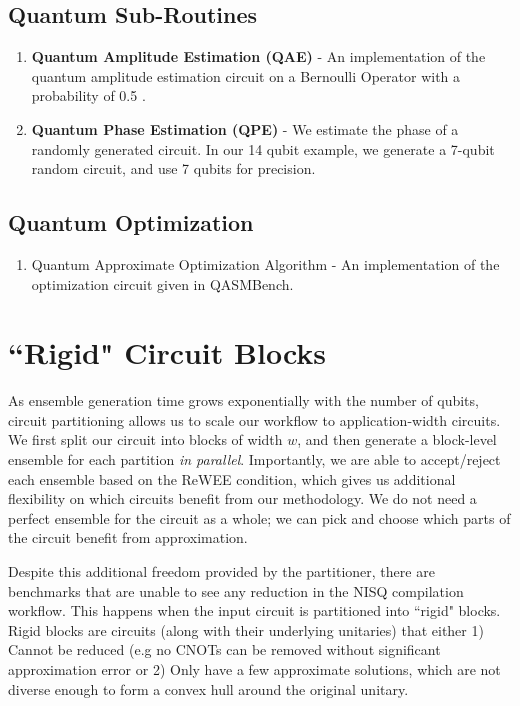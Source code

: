 \documentclass[fleqn,10pt]{wlscirep}
\begin{document}
\subsection*{Quantum Sub-Routines}

\begin{enumerate}
    \item \textbf{Quantum Amplitude Estimation (QAE)} - An implementation of the quantum amplitude estimation circuit on a Bernoulli Operator with a probability of 0.5 \cite{qiskit, brassard}.
    \item \textbf{Quantum Phase Estimation (QPE)} - We estimate the phase of a randomly generated circuit. In our 14 qubit example, we generate a 7-qubit random circuit, and use 7 qubits for precision.
\end{enumerate}

\subsection*{Quantum Optimization}

\begin{enumerate}
    \item Quantum Approximate Optimization Algorithm - An implementation of the optimization circuit given in QASMBench\cite{qasm_bench}.
\end{enumerate}

\section{``Rigid" Circuit Blocks}
\label{sec:rigid_blocks}
As ensemble generation time grows exponentially with the number of qubits, circuit partitioning allows us to scale our workflow to application-width circuits. We first split our circuit into blocks of width $w$, and then generate a block-level ensemble for each partition \emph{in parallel}. Importantly, we are able to accept/reject each ensemble based on the ReWEE condition, which gives us additional flexibility on which circuits benefit from our methodology. We do not need a perfect ensemble for the circuit as a whole; we can pick and choose which parts of the circuit benefit from approximation.

Despite this additional freedom provided by the partitioner, there are benchmarks that are unable to see any reduction in the NISQ compilation workflow. This happens when the input circuit is partitioned into ``rigid" blocks. Rigid blocks are circuits (along with their underlying unitaries) that either 1) Cannot be reduced (e.g no CNOTs can be removed without significant approximation error or 2) Only have a few approximate solutions, which are not diverse enough to form a convex hull around the original unitary.
\end{document}
